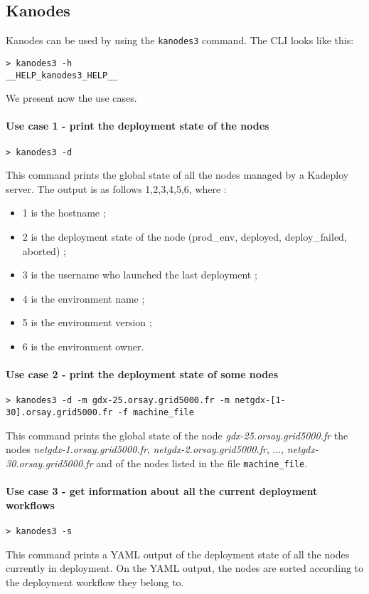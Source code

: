 \documentclass[a4wide,10pt,oneside]{book}
\begin{document}
\subsection{Kanodes}\label{sec:kanodes}
Kanodes can be used by using the \texttt{kanodes3} command. The CLI looks like this:
\begin{small}
\begin{verbatim}
> kanodes3 -h
__HELP_kanodes3_HELP__
\end{verbatim}
\end{small}

We present now the use cases.
\paragraph{Use case 1 - print the deployment state of the nodes}
\begin{verbatim}
> kanodes3 -d
\end{verbatim}
This command prints the global state of all the nodes managed by a Kadeploy server. The output is as follows 1,2,3,4,5,6, where :
\begin{itemize}
\item 1 is the hostname ;
\item 2 is the deployment state of the node (prod\_env, deployed, deploy\_failed, aborted) ;
\item 3 is the username who launched the last deployment ;
\item 4 is the environment name ;
\item 5 is the environment version ;
\item 6 is the environment owner.
\end{itemize}

\paragraph{Use case 2 - print the deployment state of some nodes}
\begin{verbatim}
> kanodes3 -d -m gdx-25.orsay.grid5000.fr -m netgdx-[1-30].orsay.grid5000.fr -f machine_file
\end{verbatim}
This command prints the global state of the node \textit{gdx-25.orsay.grid5000.fr} the nodes \textit{netgdx-1.orsay.grid5000.fr}, \textit{netgdx-2.orsay.grid5000.fr}, ..., \textit{netgdx-30.orsay.grid5000.fr} and of the nodes listed in the file \texttt{machine\_file}.

\paragraph{Use case 3 - get information about all the current deployment workflows}
\begin{verbatim}
> kanodes3 -s
\end{verbatim}
This command prints a YAML output of the deployment state of all the nodes currently in deployment. On the YAML output, the nodes are sorted according to the deployment workflow they belong to.
\end{document}
